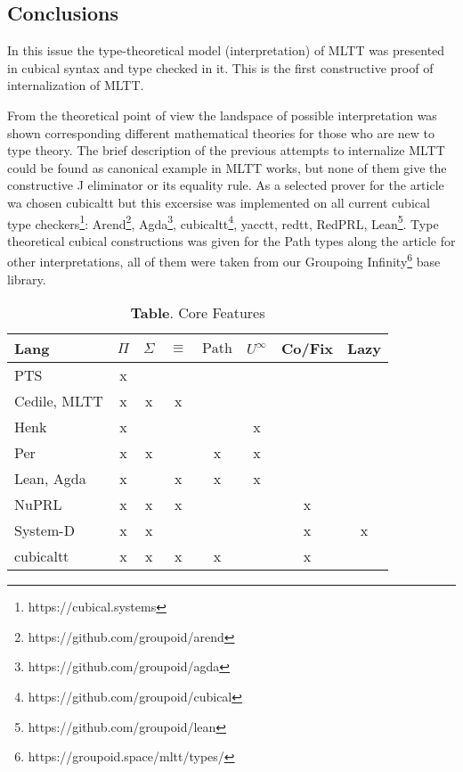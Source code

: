 \documentclass{article}
\theoremstyle{definition}
\begin{document}
\subsection*{Conclusions}

In this issue the type-theoretical model (interpretation) of MLTT was
presented in cubical syntax and type checked in it.
This is the first constructive proof of internalization of MLTT.

From the theoretical point of view the landspace of possible interpretation was shown
corresponding different mathematical theories for those who are new to type theory.
The brief description of the previous attempts to internalize MLTT could
be found as canonical example in MLTT works, but none of them give the constructive
J eliminator or its equality rule. As a selected prover for the article wa
chosen cubicaltt but this excersise was implemented on all current
cubical type checkers\footnote{https://cubical.systems}:
Arend\footnote{https://github.com/groupoid/arend},
Agda\footnote{https://github.com/groupoid/agda},
cubicaltt\footnote{https://github.com/groupoid/cubical},
yacctt, redtt, RedPRL, Lean\footnote{https://github.com/groupoid/lean}.
Type theoretical cubical constructions was given for the Path types
along the article for other interpretations, all of them were taken from our Groupoing
Infinity\footnote{https://groupoid.space/mltt/types/} base library.

\begin{table}[!ht]
  \centering
  \caption*{\textbf{Table}. Core Features}
  \begin{adjustbox}{width=\columnwidth,center}
  \begin{tabular}{lccccccc}
    \hline
       Lang          & $\Pi$ & $\Sigma$ & $\equiv$ & $\text{Path}$ & $U^{\infty}$ & Co/Fix & Lazy\\
    \hline
       PTS           & x \\
       Cedile, MLTT  & x & x & x \\
       Henk          & x &   &   &   & x \\
       Per           & x & x &   & x & x \\
       Lean, Agda    & x &   & x & x & x  \\
       NuPRL         & x & x & x &   &   & x \\
       System-D      & x & x &   &   &   & x & x\\
       cubicaltt     & x & x & x & x &   & x \\
  \end{tabular}
  \end{adjustbox}
\end{table}
\end{document}
